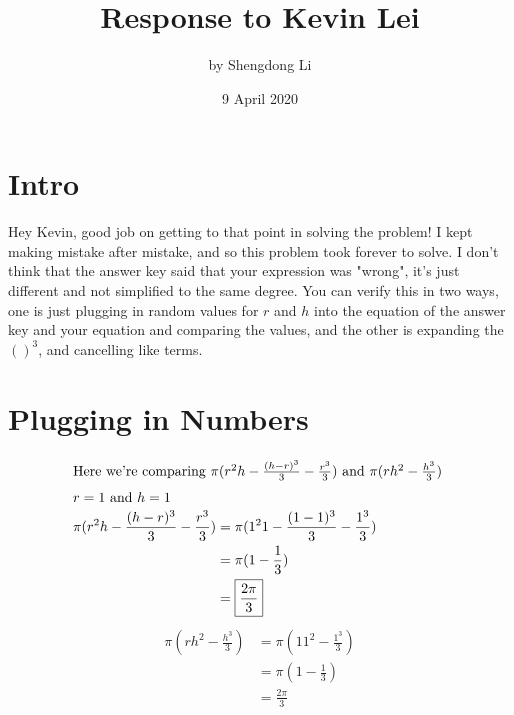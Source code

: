\documentclass[letterpaper, 12pt]{article}
\begin{document}
\title{Response to Kevin Lei}
\author{by Shengdong Li}
\date{9 April 2020}
\maketitle

\section{Intro}
Hey Kevin, good job on getting to that point in solving the problem! I kept making mistake after mistake, and so this problem took forever to solve. I don't think that the answer key said that your expression was "wrong", it's just different and not simplified to the same degree. You can verify this in two ways, one is just plugging in random values for $r$ and $h$ into the equation of the answer key and your equation and comparing the values, and the other is expanding the $()^3$, and cancelling like terms.

\section{Plugging in Numbers}
\begin{align}
    \intertext{Here we're comparing $\pi(r^2h-\frac{(h-r)^3}{3}-\frac{r^3}{3})$ and $\pi(rh^2-\frac{h^3}{3})$
    }
    \intertext{$r=1$ and $h=1$}
    \pi(r^2h-\frac{(h-r)^3}{3}-\frac{r^3}{3}) & =\pi(1^21-\frac{(1-1)^3}{3}-\frac{1^3}{3})          \\
    \nonumber                                 & =\pi(1-\frac{1}{3})                                 \\
                                              & =\boxed{\frac{2\pi}{3}                            }
\end{align}
\setcounter{equation}{0}
\begin{align}
    \pi(rh^2-\frac{h^3}{3}) & = \pi(11^2-\frac{1^3}{3}) \\
    \nonumber               & = \pi(1-\frac{1}{3})      \\
                            & =\boxed{\frac{2\pi}{3}}
\end{align}
\end{document}
